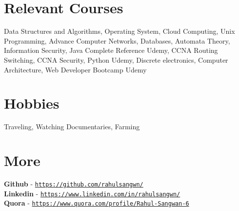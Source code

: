\documentclass[margin, centered]{res}
\begin{document}
\begin{resume}
\begin{itemize}[leftmargin=*]
\end{itemize}
\vspace{3mm}


\section{Relevant \hspace{2mm} Courses}
Data Structures and Algorithms, Operating System, Cloud Computing, Unix Programming, Advance Computer Networks, Databases, Automata Theory, Information Security, Java Complete Reference Udemy, CCNA Routing Switching, CCNA Security, Python Udemy, Discrete electronics, Computer Architecture, Web Developer Bootcamp Udemy
\vspace{3mm}


\section{Hobbies}
Traveling, Watching Documentaries, Farming
\vspace{3mm}


\section{More}
\textbf{Github} - \href{https://github.com/rahulsangwn}{\texttt{https://github.com/rahulsangwn/}} \\
\textbf{Linkedin} - \href{https://www.linkedin.com/in/rahulsangwn/}{\texttt{https://www.linkedin.com/in/rahulsangwn/}} \\
\textbf{Quora} - \href{https://www.quora.com/profile/Rahul-Sangwan-6}{\texttt{https://www.quora.com/profile/Rahul-Sangwan-6}}


\end{resume}
\end{document}
